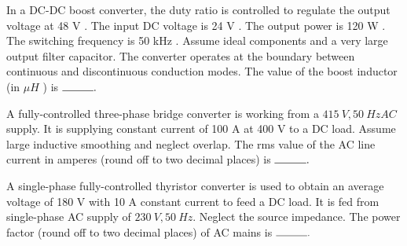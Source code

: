   \item In a DC-DC boost converter, the duty ratio is controlled to regulate the output voltage at 48 V . The input DC voltage is 24 V . The output power is 120 W . The switching frequency is 50 kHz . Assume ideal components and a very large output filter capacitor. The converter operates at the boundary between continuous and discontinuous conduction modes. The value of the boost inductor (in $\mu {H}$ ) is $\rule{1cm}{0.15mm} . $ 
  \hfill{}

  \item A fully-controlled three-phase bridge converter is working from a $415 {~V}, 50 {~Hz} {AC}$ supply. It is supplying constant current of 100 A at 400 V to a DC load. Assume large inductive smoothing and neglect overlap. The rms value of the AC line current in amperes (round off to two decimal places) is $\rule{1cm}{0.15mm} . $ 
  \hfill{}
  
  
  

\item A single-phase fully-controlled thyristor converter is used to obtain an average voltage of 180 V with 10 A constant current to feed a DC load. It is fed from single-phase AC supply of $230 {~V}, 50 {~Hz}$. Neglect the source impedance. The power factor (round off to two decimal places) of AC mains is $\rule{1cm}{0.15mm} . $ 
\hfill{}



